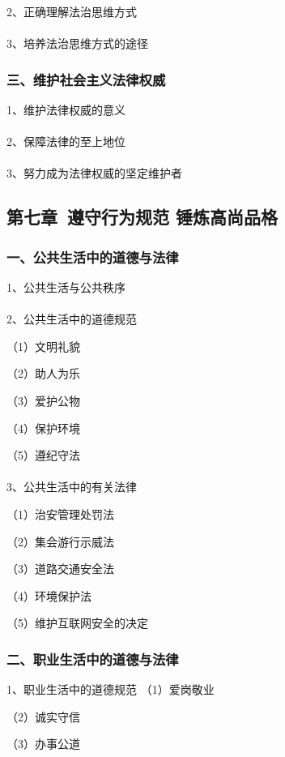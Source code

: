 \documentclass{ctexart}
\begin{document}
2、正确理解法治思维方式
\\\\

3、培养法治思维方式的途径

\subsubsection{三、维护社会主义法律权威}

1、维护法律权威的意义
\\\\

2、保障法律的至上地位
\\\\

3、努力成为法律权威的坚定维护者

\subsection{第七章\ 遵守行为规范 锤炼高尚品格} 

\subsubsection{一、公共生活中的道德与法律}
1、公共生活与公共秩序
\\\\

2、公共生活中的道德规范

（1）文明礼貌

（2）助人为乐

（3）爱护公物

（4）保护环境

（5）遵纪守法
\\\\

3、公共生活中的有关法律

（1）治安管理处罚法

（2）集会游行示威法

（3）道路交通安全法

（4）环境保护法

（5）维护互联网安全的决定


\subsubsection{二、职业生活中的道德与法律}
1、职业生活中的道德规范
（1）爱岗敬业

（2）诚实守信

（3）办事公道
\end{document}
